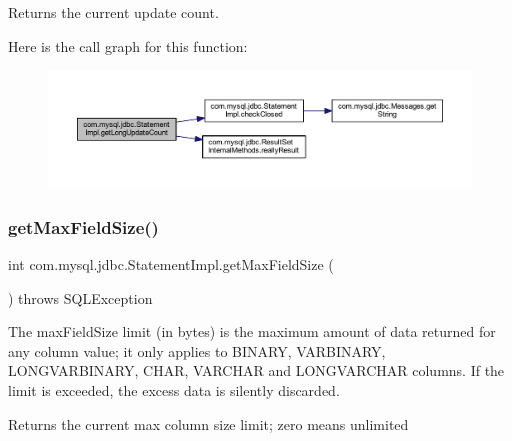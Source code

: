 \begin{DoxyReturn}{Returns}
the current update count. 
\end{DoxyReturn}
Here is the call graph for this function\+:
\nopagebreak
\begin{figure}[H]
\begin{center}
\leavevmode
\includegraphics[width=350pt]{classcom_1_1mysql_1_1jdbc_1_1_statement_impl_a698a1458d2109c83b0e3beaec53ce933_cgraph}
\end{center}
\end{figure}
\mbox{\label{classcom_1_1mysql_1_1jdbc_1_1_statement_impl_a066cb00e850efd48fd78d5f717fd0626}} 
\subsubsection{\texorpdfstring{get\+Max\+Field\+Size()}{getMaxFieldSize()}}
{\footnotesize\ttfamily int com.\+mysql.\+jdbc.\+Statement\+Impl.\+get\+Max\+Field\+Size (\begin{DoxyParamCaption}{ }\end{DoxyParamCaption}) throws S\+Q\+L\+Exception}

The max\+Field\+Size limit (in bytes) is the maximum amount of data returned for any column value; it only applies to B\+I\+N\+A\+RY, V\+A\+R\+B\+I\+N\+A\+RY, L\+O\+N\+G\+V\+A\+R\+B\+I\+N\+A\+RY, C\+H\+AR, V\+A\+R\+C\+H\+AR and L\+O\+N\+G\+V\+A\+R\+C\+H\+AR columns. If the limit is exceeded, the excess data is silently discarded.

\begin{DoxyReturn}{Returns}
the current max column size limit; zero means unlimited
\end{DoxyReturn}

